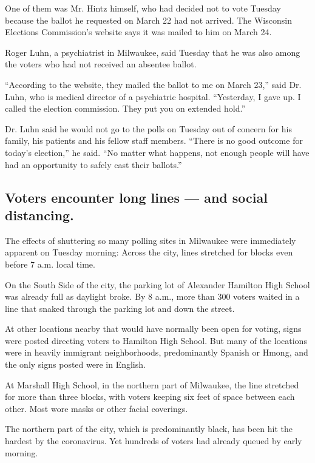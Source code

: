 One of them was Mr. Hintz himself, who had decided not to vote Tuesday
because the ballot he requested on March 22 had not arrived. The
Wisconsin Elections Commission's website says it was mailed to him on
March 24.

Roger Luhn, a psychiatrist in Milwaukee, said Tuesday that he was also
among the voters who had not received an absentee ballot.

``According to the website, they mailed the ballot to me on March 23,''
said Dr. Luhn, who is medical director of a psychiatric hospital.
``Yesterday, I gave up. I called the election commission. They put you
on extended hold.''

Dr. Luhn said he would not go to the polls on Tuesday out of concern for
his family, his patients and his fellow staff members. ``There is no
good outcome for today's election,'' he said. ``No matter what happens,
not enough people will have had an opportunity to safely cast their
ballots.''

\hypertarget{voters-encounter-long-lines--and-social-distancing}{%
\subsection{Voters encounter long lines --- and social
distancing.}\label{voters-encounter-long-lines--and-social-distancing}}

The effects of shuttering so many polling sites in Milwaukee were
immediately apparent on Tuesday morning: Across the city, lines
stretched for blocks even before 7 a.m. local time.

On the South Side of the city, the parking lot of Alexander Hamilton
High School was already full as daylight broke. By 8 a.m., more than 300
voters waited in a line that snaked through the parking lot and down the
street.

At other locations nearby that would have normally been open for voting,
signs were posted directing voters to Hamilton High School. But many of
the locations were in heavily immigrant neighborhoods, predominantly
Spanish or Hmong, and the only signs posted were in English.

At Marshall High School, in the northern part of Milwaukee, the line
stretched for more than three blocks, with voters keeping six feet of
space between each other. Most wore masks or other facial coverings.

The northern part of the city, which is predominantly black, has been
hit the hardest by the coronavirus. Yet hundreds of voters had already
queued by early morning.

